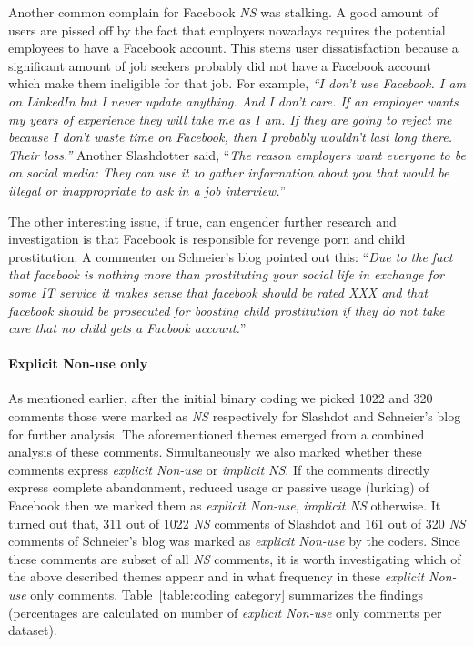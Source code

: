 Another common complain for Facebook \emph{NS} was stalking. A good amount of users are pissed off by the fact that employers nowadays requires the potential employees to have a Facebook account. This stems user dissatisfaction because a significant amount of job seekers probably did not have a Facebook account which make them ineligible for that job. For example, \textit{``I don't use Facebook. I am on LinkedIn but I never update anything. And I don't care. If an employer wants my years of experience they will take me as I am. If they are going to reject me because I don't waste time on Facebook, then I probably wouldn't last long there. Their loss.''} Another Slashdotter said, ``\textit{The reason employers want everyone to be on social media: They can use it to gather information about you that would be illegal or inappropriate to ask in a job interview.}''
     
The other interesting issue, if true, can engender further research and investigation is that Facebook is responsible for revenge porn and child prostitution. A commenter on Schneier's blog pointed out this: ``\textit{Due to the fact that facebook is nothing more than prostituting your social life in exchange for some IT service it makes sense that facebook should be rated XXX and that facebook should be prosecuted for boosting child prostitution if they do not take care that no child gets a Facbook account.}''
 
 

\paragraph{Explicit Non-use only}
As mentioned earlier, after the initial binary coding we picked 1022 and 320 comments those were marked as \emph{NS} respectively for Slashdot and Schneier's blog for further analysis. The aforementioned themes emerged from a combined analysis of these comments. Simultaneously we also marked whether these comments express \emph{explicit Non-use} or \emph{implicit NS}. If the comments directly express complete abandonment, reduced usage or passive usage (lurking) of Facebook then we marked them as \emph{explicit Non-use}, \emph{implicit NS} otherwise. It turned out that, 311 out of 1022 \emph{NS} comments of Slashdot and 161 out of 320 \emph{NS} comments of Schneier's blog was marked as \emph{explicit Non-use} by the coders. Since these comments are subset of all \emph{NS} comments, it is worth investigating which of the above described themes appear and in what frequency in these \emph{explicit Non-use} only comments. Table~\ref{table:coding category} summarizes the findings (percentages are calculated on number of \emph{explicit Non-use} only comments per dataset). 

